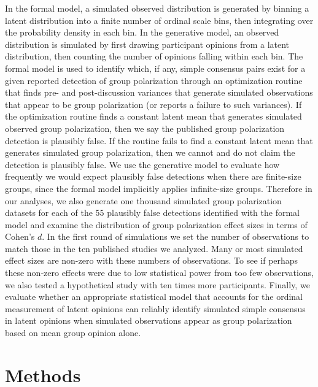 \documentclass[
  abstract]{article}
\begin{document}
In the formal model, a simulated observed distribution is generated by
binning a latent distribution into a finite number of ordinal scale
bins, then integrating over the probability density in each bin. In the
generative model, an observed distribution is simulated by first drawing
participant opinions from a latent distribution, then counting the
number of opinions falling within each bin. The formal model is used to
identify which, if any, simple consensus pairs exist for a given
reported detection of group polarization through an optimization routine
that finds pre- and post-discussion variances that generate simulated
observations that appear to be group polarization (or reports a failure
to such variances). If the optimization routine finds a constant latent
mean that generates simulated observed group polarization, then we say
the published group polarization detection is plausibly false. If the
routine fails to find a constant latent mean that generates simulated
group polarization, then we cannot and do not claim the detection is
plausibly false. We use the generative model to evaluate how frequently
we would expect plausibly false detections when there are finite-size
groups, since the formal model implicitly applies infinite-size groups.
Therefore in our analyses, we also generate one thousand simulated group
polarization datasets for each of the 55 plausibly false detections
identified with the formal model and examine the distribution of group
polarization effect sizes in terms of Cohen's \(d\). In the first round
of simulations we set the number of observations to match those in the
ten published studies we analyzed. Many or most simulated effect sizes
are non-zero with these numbers of observations. To see if perhaps these
non-zero effects were due to low statistical power from too few
observations, we also tested a hypothetical study with ten times more
participants. Finally, we evaluate whether an appropriate statistical
model that accounts for the ordinal measurement of latent opinions can
reliably identify simulated simple consensus in latent opinions when
simulated observations appear as group polarization based on mean group
opinion alone.

\section{Methods}\label{methods}

\end{document}
